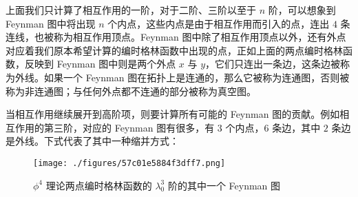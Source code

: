 上面我们只计算了相互作用的一阶，对于二阶、三阶以至于 $n$ 阶，可以想象到 Feynman 图中将出现 $n$ 个内点，这些内点是由于相互作用而引入的点，连出 $4$ 条连线，也被称为相互作用顶点。Feynman 图中除了相互作用顶点以外，还有外点对应着我们原本希望计算的编时格林函数中出现的点，正如上面的两点编时格林函数，反映到 Feynman 图中则是两个外点 $x$ 与 $y$，它们只连出一条边，这条边被称为外线。如果一个 Feynman 图在拓扑上是连通的，那么它被称为连通图，否则被称为非连通图；与任何外点都不连通的部分被称为真空图。

当相互作用继续展开到高阶项，则要计算所有可能的 Feynman 图的贡献。例如相互作用的第三阶，对应的 Feynman 图有很多，有 $3$ 个内点，$6$ 条边，其中 $2$ 条边是外线。下式代表了其中一种缩并方式：
\begin{figure}[ht]
\centering
\texttt{[image: ./figures/57c01e5884f3dff7.png]}
\caption{$\phi^4$ 理论两点编时格林函数的 $\lambda_0^3$ 阶的其中一个 Feynman 图} \label{fig_wick2}
\end{figure}
